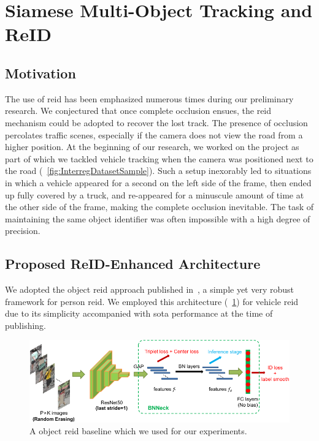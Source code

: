 \section{Siamese Multi-Object Tracking and ReID}
\label{sec:SiamMOTandReID}

\subsection{Motivation}

The use of \gls{reid} has been emphasized numerous times during our preliminary research. We conjectured that once complete occlusion ensues, the \gls{reid} mechanism could be adopted to recover the lost track. The presence of occlusion percolates traffic scenes, especially if the camera does not view the road from a higher position. At the beginning of our research, we worked on the \interreg{} project as part of which we tackled vehicle tracking when the camera was positioned next to the road (\figtext{}~\ref{fig:InterregDatasetSample}). Such a setup inexorably led to situations in which a vehicle appeared for a second on the left side of the frame, then ended up fully covered by a truck, and re-appeared for a minuscule amount of time at the other side of the frame, making the complete occlusion inevitable. The task of maintaining the same object identifier was often impossible with a high degree of precision.

\subsection{Proposed ReID-Enhanced Architecture}
\label{ssec:ProposedReIDEnhancedArchitecture}

We adopted the object \gls{reid} approach published in~\cite{luo2019bagoftricksreid}, a simple yet very robust framework for person \gls{reid}. We employed this architecture (\figtext{}~\ref{fig:BagOfTricksReIDArchitecture}) for vehicle \gls{reid} due to its simplicity accompanied with \gls{sota} performance at the time of publishing.

\begin{figure}[!t]
    \centering
    \includegraphics[width=\linewidth]{figures/siamese_tracking/bagoftricks_reid_architecture.pdf}
    \caption[\gls{reid} baseline]{A object \gls{reid} baseline which we used for our experiments. }
    \label{fig:BagOfTricksReIDArchitecture}
\end{figure}

